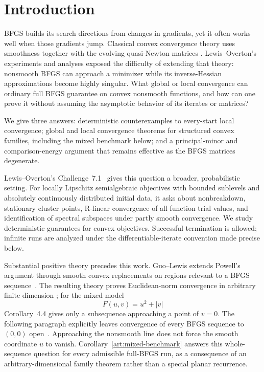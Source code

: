 \section{Introduction}\label{art:introduction}

BFGS builds its search directions from changes in gradients, yet it often
works well when those gradients jump. Classical convex convergence theory
uses smoothness together with the evolving quasi-Newton matrices
\cite{FND_P76,FND_BN89,FND_N92}. Lewis--Overton's experiments and analyses
\cite{LO} exposed the difficulty of extending that theory: nonsmooth BFGS can
approach a minimizer while its inverse-Hessian approximations become highly
singular. What global or local convergence can ordinary full BFGS guarantee
on convex nonsmooth functions, and how can one prove it without assuming
the asymptotic behavior of its iterates or matrices?

We give three answers: deterministic counterexamples to every-start local
convergence; global and local convergence theorems for structured convex
families, including the mixed benchmark below; and a principal-minor and
comparison-energy argument that remains effective as the BFGS matrices
degenerate.

Lewis--Overton's Challenge~7.1~\cite{LO} gives this question a broader,
probabilistic setting. For locally Lipschitz semialgebraic objectives with
bounded sublevels and absolutely continuously distributed initial data, it
asks about nonbreakdown, stationary cluster points, R-linear convergence of
all function trial values, and identification of spectral subspaces under
partly smooth convergence. We study deterministic guarantees for convex
objectives. Successful termination is allowed; infinite runs are analyzed
under the differentiable-iterate convention made precise below.

Substantial positive theory precedes this work. Guo--Lewis extends Powell's
argument through smooth convex replacements on regions relevant to a BFGS
sequence~\cite[Theorems~3.2, 4.1 and~4.3]{GL18}. The resulting theory proves
Euclidean-norm convergence in arbitrary finite dimension
\cite[Corollary~4.2]{GL18}; for the mixed model
\[
                    F(u,v)=u^2+|v|
\]
Corollary~4.4 gives only a subsequence approaching a point of $v=0$.
The following paragraph explicitly leaves convergence of every BFGS sequence
to $(0,0)$ open~\cite[Corollary~4.4 and following discussion]{GL18}.
Approaching the nonsmooth line does not force the smooth coordinate $u$ to
vanish. Corollary~\ref{art:mixed-benchmark} answers this whole-sequence question
for every admissible full-BFGS run, as a consequence of an arbitrary-dimensional
family theorem rather than a special planar recurrence.

